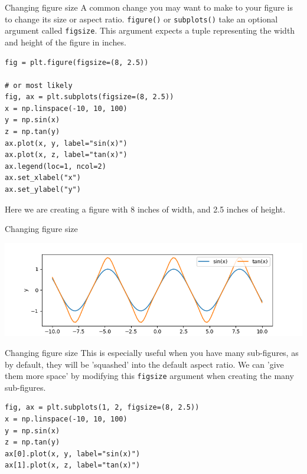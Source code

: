 \documentclass[10pt]{beamer}
\begin{document}
\begin{frame}[label={sec:org0fafd40},fragile]{Changing figure size}
 A common change you may want to make to your figure is to change its size or
aspect ratio. \texttt{figure()} or \texttt{subplots()} take an optional argument called
\texttt{figsize}. This argument expects a tuple representing the width and height of the
figure in inches.

\begin{verbatim}
fig = plt.figure(figsize=(8, 2.5))

# or most likely
fig, ax = plt.subplots(figsize=(8, 2.5))
x = np.linspace(-10, 10, 100)
y = np.sin(x)
z = np.tan(y)
ax.plot(x, y, label="sin(x)")
ax.plot(x, z, label="tan(x)")
ax.legend(loc=1, ncol=2)
ax.set_xlabel("x")
ax.set_ylabel("y")
\end{verbatim}

Here we are creating a figure with 8 inches of width, and 2.5 inches of height.
\end{frame}

\begin{frame}[label={sec:orgba21e8a}]{Changing figure size}
\begin{center}
\includegraphics[width=.9\linewidth]{images/fig-size.png}
\end{center}
\end{frame}

\begin{frame}[label={sec:org92a9950},fragile]{Changing figure size}
 This is especially useful when you have many sub-figures, as by default, they
will be 'squashed' into the default aspect ratio. We can 'give them more space'
by modifying this \texttt{figsize} argument when creating the many sub-figures.

\begin{verbatim}
fig, ax = plt.subplots(1, 2, figsize=(8, 2.5))
x = np.linspace(-10, 10, 100)
y = np.sin(x)
z = np.tan(y)
ax[0].plot(x, y, label="sin(x)")
ax[1].plot(x, z, label="tan(x)")
\end{verbatim}
\end{frame}
\end{document}
